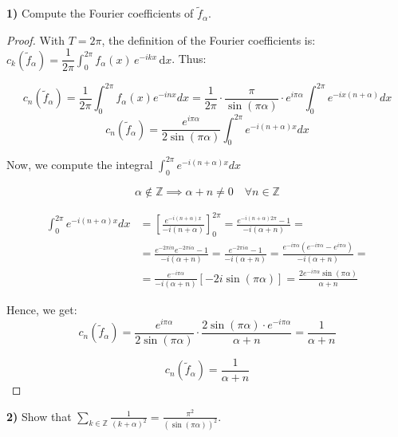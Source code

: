 \documentclass[11pt]{article}
\newcommand{\Z}{\mathbb{Z}}
\newcommand{\dd}{\,\mathrm{d}}
\newcommand{\ck}[1]{c_{#1}}
\begin{document}
\bigskip
\noindent\textbf{1)} Compute the Fourier coefficients of $\tilde f_\alpha$.

\begin{proof}
With $T=2\pi$, the definition of the Fourier coefficients is:
$\ck{k}(\tilde f_\alpha)=\dfrac1{2\pi}\displaystyle\int_0^{2\pi}f_\alpha(x)\,e^{-ikx}\dd x$. Thus:

\[ c_n(\tilde{f}_\alpha) = \frac{1}{2\pi} \int_0^{2\pi} f_\alpha(x) e^{-inx} dx = \frac{1}{2\pi} \cdot \frac{\pi}{\sin(\pi\alpha)} \cdot e^{i\pi\alpha} \int_0^{2\pi} e^{-ix(n+\alpha)} dx \]
\[ c_n(\tilde{f}_\alpha) = \frac{e^{i\pi\alpha}}{2\sin(\pi\alpha)} \int_0^{2\pi} e^{-i(n+\alpha)x} dx \]

\vspace{0.2cm}
\noindent Now, we compute the integral $\int_0^{2\pi} e^{-i(n+\alpha)x} dx$

\[ \alpha \notin \mathbb{Z} \implies \alpha + n \neq 0 \quad \forall n \in \mathbb{Z} \]

\begin{align*}
\int_0^{2\pi} e^{-i(n+\alpha)x} dx &= \left[ \frac{e^{-i(n+\alpha)x}}{-i(n+\alpha)} \right]_0^{2\pi} = \frac{e^{-i(n+\alpha)2\pi} - 1}{-i(\alpha+n)} = \\[10pt]
&= \frac{e^{-2\pi in} e^{-2\pi i\alpha} - 1}{-i(\alpha+n)} = \frac{e^{-2\pi i\alpha} - 1}{-i(\alpha+n)} = \frac{e^{-i\pi\alpha}(e^{-i\pi\alpha} - e^{i\pi\alpha})}{-i(\alpha+n)} = \\[10pt]
&= \frac{e^{-i\pi\alpha}}{-i(\alpha+n)} [-2i\sin(\pi\alpha)] = \frac{2 e^{-i\pi\alpha} \sin(\pi\alpha)}{\alpha+n}
\end{align*}

\vspace{0.2cm}
\noindent Hence, we get:
\[ c_n(\tilde{f}_\alpha) = \frac{e^{i\pi\alpha}}{2\sin(\pi\alpha)} \cdot \frac{2\sin(\pi\alpha) \cdot e^{-i\pi\alpha}}{\alpha+n} = \frac{1}{\alpha+n} \]

\[ \boxed{ c_n(\tilde{f}_\alpha) = \frac{1}{\alpha+n} } \]

\end{proof}

\bigskip
\noindent\textbf{2)} Show that
$\displaystyle\sum_{k\in\Z}\frac{1}{(k+\alpha)^{2}}=\frac{\pi^{2}}{(\sin(\pi\alpha))^{2}}$.
\end{document}
